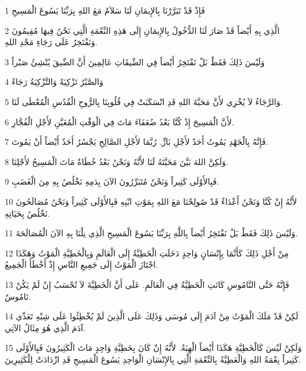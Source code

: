 \par 1 فَإِذْ قَدْ تَبَرَّرْنَا بِالإِيمَانِ لَنَا سَلاَمٌ مَعَ اللهِ بِرَبِّنَا يَسُوعَ الْمَسِيحِ
\par 2 الَّذِي بِهِ أَيْضاً قَدْ صَارَ لَنَا الدُّخُولُ بِالإِيمَانِ إِلَى هَذِهِ النِّعْمَةِ الَّتِي نَحْنُ فِيهَا مُقِيمُونَ وَنَفْتَخِرُ عَلَى رَجَاءِ مَجْدِ اللهِ.
\par 3 وَلَيْسَ ذَلِكَ فَقَطْ بَلْ نَفْتَخِرُ أَيْضاً فِي الضِّيقَاتِ عَالِمِينَ أَنَّ الضِّيقَ يُنْشِئُ صَبْراً
\par 4 وَالصَّبْرُ تَزْكِيَةً وَالتَّزْكِيَةُ رَجَاءً
\par 5 وَالرَّجَاءُ لاَ يُخْزِي لأَنَّ مَحَبَّةَ اللهِ قَدِ انْسَكَبَتْ فِي قُلُوبِنَا بِالرُّوحِ الْقُدُسِ الْمُعْطَى لَنَا.
\par 6 لأَنَّ الْمَسِيحَ إِذْ كُنَّا بَعْدُ ضُعَفَاءَ مَاتَ فِي الْوَقْتِ الْمُعَيَّنِ لأَجْلِ الْفُجَّارِ.
\par 7 فَإِنَّهُ بِالْجَهْدِ يَمُوتُ أَحَدٌ لأَجْلِ بَارٍّ. رُبَّمَا لأَجْلِ الصَّالِحِ يَجْسُرُ أَحَدٌ أَيْضاً أَنْ يَمُوتَ.
\par 8 وَلَكِنَّ اللهَ بَيَّنَ مَحَبَّتَهُ لَنَا لأَنَّهُ وَنَحْنُ بَعْدُ خُطَاةٌ مَاتَ الْمَسِيحُ لأَجْلِنَا.
\par 9 فَبِالأَوْلَى كَثِيراً وَنَحْنُ مُتَبَرِّرُونَ الآنَ بِدَمِهِ نَخْلُصُ بِهِ مِنَ الْغَضَبِ.
\par 10 لأَنَّهُ إِنْ كُنَّا وَنَحْنُ أَعْدَاءٌ قَدْ صُولِحْنَا مَعَ اللهِ بِمَوْتِ ابْنِهِ فَبِالأَوْلَى كَثِيراً وَنَحْنُ مُصَالَحُونَ نَخْلُصُ بِحَيَاتِهِ.
\par 11 وَلَيْسَ ذَلِكَ فَقَطْ بَلْ نَفْتَخِرُ أَيْضاً بِاللَّهِ بِرَبِّنَا يَسُوعَ الْمَسِيحِ الَّذِي نِلْنَا بِهِ الآنَ الْمُصَالَحَةَ.
\par 12 مِنْ أَجْلِ ذَلِكَ كَأَنَّمَا بِإِنْسَانٍ وَاحِدٍ دَخَلَتِ الْخَطِيَّةُ إِلَى الْعَالَمِ وَبِالْخَطِيَّةِ الْمَوْتُ وَهَكَذَا اجْتَازَ الْمَوْتُ إِلَى جَمِيعِ النَّاسِ إِذْ أَخْطَأَ الْجَمِيعُ.
\par 13 فَإِنَّهُ حَتَّى النَّامُوسِ كَانَتِ الْخَطِيَّةُ فِي الْعَالَمِ. عَلَى أَنَّ الْخَطِيَّةَ لاَ تُحْسَبُ إِنْ لَمْ يَكُنْ نَامُوسٌ.
\par 14 لَكِنْ قَدْ مَلَكَ الْمَوْتُ مِنْ آدَمَ إِلَى مُوسَى وَذَلِكَ عَلَى الَّذِينَ لَمْ يُخْطِئُوا عَلَى شِبْهِ تَعَدِّي آدَمَ الَّذِي هُوَ مِثَالُ الآتِي.
\par 15 وَلَكِنْ لَيْسَ كَالْخَطِيَّةِ هَكَذَا أَيْضاً الْهِبَةُ. لأَنَّهُ إِنْ كَانَ بِخَطِيَّةِ وَاحِدٍ مَاتَ الْكَثِيرُونَ فَبِالأَوْلَى كَثِيراً نِعْمَةُ اللهِ وَالْعَطِيَّةُ بِالنِّعْمَةِ الَّتِي بِالإِنْسَانِ الْوَاحِدِ يَسُوعَ الْمَسِيحِ قَدِ ازْدَادَتْ لِلْكَثِيرِينَ.
